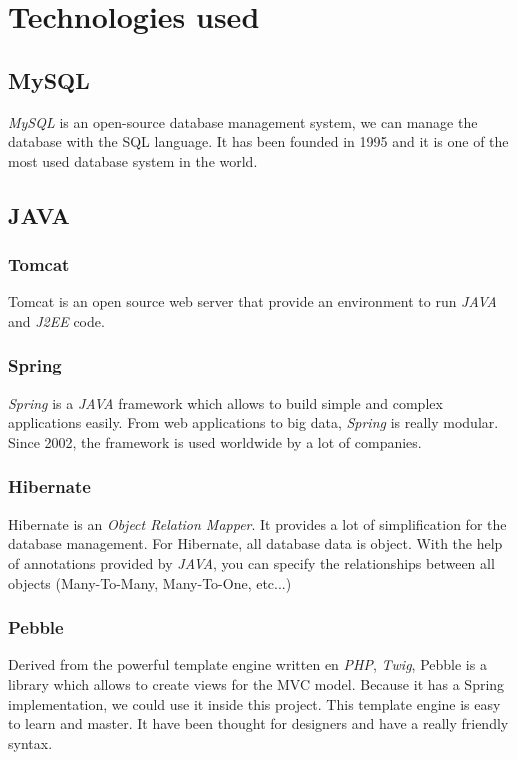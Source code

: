 \chapter{Technologies used}

\section{MySQL}

\textit{MySQL} is an open-source database management system, we can manage the database with the SQL language.  It has been founded in 1995 and it is one of the most used database system in the world.

\section{JAVA}
\subsection{Tomcat}

Tomcat is an open source web server that provide an environment to run \textit{JAVA} and \textit{J2EE} code.

\subsection{Spring}
\textit{Spring} is a \textit{JAVA} framework which allows to build simple and complex applications easily. From web applications to big data, \textit{Spring} is really modular. Since 2002, the framework is used worldwide by a lot of companies. 


\subsection{Hibernate}
Hibernate is an \textit{Object Relation Mapper}. It provides a lot of simplification for the database management. For Hibernate, all database data is object. With the help of annotations provided by \textit{JAVA}, you can specify the relationships between all objects (Many-To-Many, Many-To-One, etc...) 


\subsection{Pebble}
Derived from the powerful template engine written en \textit{PHP}, \textit{Twig}, Pebble is a library which allows to create views for the MVC model. Because it has a Spring implementation, we could use it inside this project. This template engine is easy to learn and master. It have been thought for designers and have a really friendly syntax.

